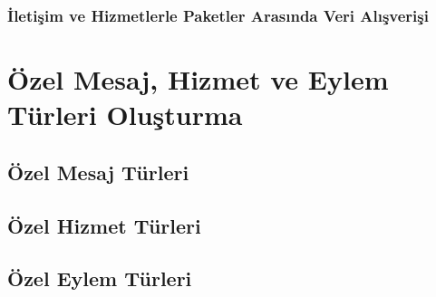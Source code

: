 \subsubsection{İletişim ve Hizmetlerle Paketler Arasında Veri Alışverişi}

\section{Özel Mesaj, Hizmet ve Eylem Türleri Oluşturma}
\subsection{Özel Mesaj Türleri}

\subsection{Özel Hizmet Türleri}

\subsection{Özel Eylem Türleri}



